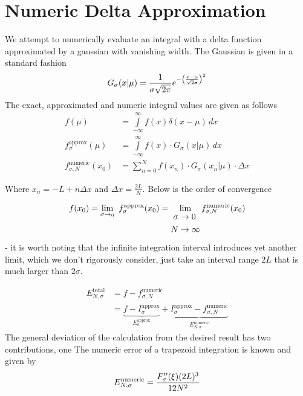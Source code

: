 \newpage
\section{Numeric Delta Approximation}
\label{app:numeric_delta_approximation}

We attempt to numerically evaluate an integral with a delta function approximated by a gaussian with vanishing width. The Gaussian is given in a standard fashion
\begin{equation}
G_{\sigma}(x|\mu)=\frac{1}{\sigma \sqrt{ 2\pi }}{\Large e^{-\left( \frac{x-\mu}{\sqrt{ 2 }\sigma} \right)^{2}}}
\label{eq:gaussian_delta_definition}
\end{equation}
The exact, approximated and numeric integral values are given as follows
\begin{align}
f(\mu) &= \int\limits_{-\infty}^{\infty} f(x)\delta(x-\mu)\, dx \\
f^{\text{approx}}_{\sigma}(\mu) & = \int\limits_{-\infty}^{\infty} f(x)\cdot G_{\sigma}(x|\mu) \, dx \\
f^{\text{numeric}}_{\sigma,N}(x_{0}) &= \sum\limits_{n=0}^{N} f(x_{n})\cdot G_{\sigma}(x_{n}|\mu) \cdot\Delta x
\label{eq:delta_numeric_definitions}
\end{align}

Where $x_{n}= -L+n\Delta x$ and $\Delta x= \frac{{2L}}{N}$. Below is the order of convergence

\begin{equation}
f(x_{0}) = \lim\limits_{\sigma\to_{0}} \  f^{\text{approx}}_{\sigma}(x_{0}) =  \lim\limits_{\begin{aligned}
\sigma&\to0 \\ {\small N}&\to \infty
\end{aligned}}  f^{\text{numeric}}_{\sigma, N}(x_{0})
\label{eq:delta_convergence_limits}
\end{equation}
- it is worth noting that the infinite integration interval introduces yet another limit, which we don't rigorously consider, just take an interval range $2L$ that is much larger than $2\sigma$.

\begin{align}
E^{\text{total}}_{N,\sigma} &= f-f^{\text{numeric}}_{\sigma,N} \\
&= \underbrace{ f-I^{\text{approx}}_{\sigma} }_{ E_{\sigma}^{\text{approx}} }+\underbrace{ I^{\text{approx}}_{\sigma}-f^{\text{numeric}}_{\sigma,N} }_{ E_{N,\sigma}^{\text{numeric}} } 
\label{eq:delta_total_error}
\end{align}
The general deviation of the calculation from the desired result has two contributions, one 
The numeric error of a trapezoid integration is known and given by
\begin{equation}
E_{{\small N},\sigma}^{\text{numeric}}  = \frac{F_{\sigma}''(\xi)(2L)^{3}}{12N^{2}}
\label{eq:delta_trapezoid_error}
\end{equation}

